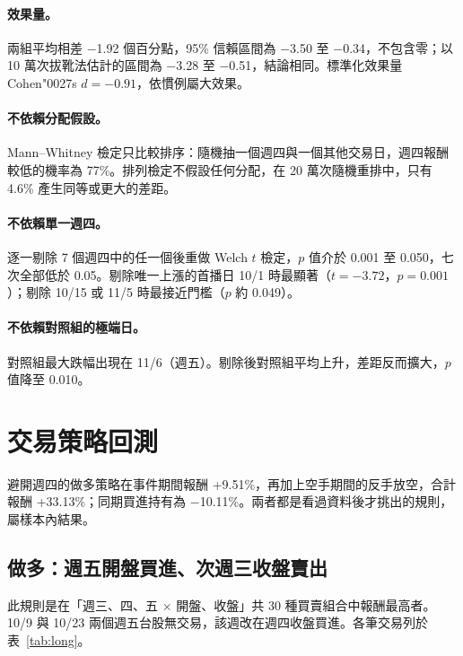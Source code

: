 \documentclass[11pt,a4paper]{article}
\newcommand{\m}{\ensuremath{-}}
\begin{document}
\paragraph{效果量。}兩組平均相差 \m 1.92 個百分點，95\% 信賴區間為 \m 3.50 至 \m 0.34，不包含零；以 10 萬次拔靴法估計的區間為 \m 3.28 至 \m 0.51，結論相同。標準化效果量 Cohen\char"0027{}s $d=-0.91$，依慣例屬大效果。

\paragraph{不依賴分配假設。}Mann--Whitney 檢定只比較排序：隨機抽一個週四與一個其他交易日，週四報酬較低的機率為 77\%。排列檢定不假設任何分配，在 20 萬次隨機重排中，只有 4.6\% 產生同等或更大的差距。

\paragraph{不依賴單一週四。}逐一剔除 7 個週四中的任一個後重做 Welch $t$ 檢定，$p$ 值介於 0.001 至 0.050，七次全部低於 0.05。剔除唯一上漲的首播日 10/1 時最顯著（$t=-3.72$，$p=0.001$）；剔除 10/15 或 11/5 時最接近門檻（$p$ 約 0.049）。

\paragraph{不依賴對照組的極端日。}對照組最大跌幅出現在 11/6（週五）。剔除後對照組平均上升，差距反而擴大，$p$ 值降至 0.010。

\section{交易策略回測}

避開週四的做多策略在事件期間報酬 +9.51\%，再加上空手期間的反手放空，合計報酬 +33.13\%；同期買進持有為 \m 10.11\%。兩者都是看過資料後才挑出的規則，屬樣本內結果。

\subsection{做多：週五開盤買進、次週三收盤賣出}

此規則是在「週三、四、五 $\times$ 開盤、收盤」共 30 種買賣組合中報酬最高者。10/9 與 10/23 兩個週五台股無交易，該週改在週四收盤買進。各筆交易列於表~\ref{tab:long}。
\end{document}
